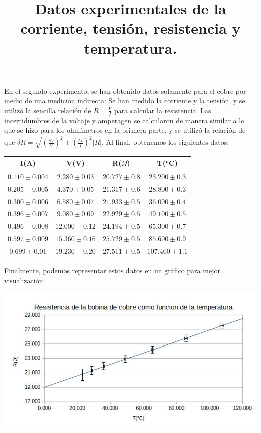 \documentclass[a4paper,12pt]{article}
\begin{document}
En el segundo experimento, se han obtenido datos solamente para el cobre por medio de una medición indirecta: Se han medido la corriente y la tensión, y se utilizó la sencilla relación de $R = \frac{V}{I}$ para calcular la resistencia. Las incertidumbres de la voltaje y amperagen se calcularon de manera similar a lo que se hizo para los ohmímetros en la primera parte, y se utilizó la relación de que $\delta R = \sqrt{\left(\frac{\delta V}{V}\right)^2 +\left(\frac{\delta I}{I}\right)^2 } |R|$. Al final, obtenemos los siguientes datos:
\begin{table}[h!]
    \title{\textbf{Datos experimentales de la corriente, tensión, resistencia y temperatura.}}
    \centering
     \begin{tabular}{||c|c|c|c||} 
     \hline
     I(A) & V(V) & R($\Omega$) & T(°C) \\ \hline
        $0.110\pm 0.004$ & $2.280\pm 0.03$ & $20.727\pm 0.8$ & $23.200\pm 0.3$ \\ \hline
        $0.205\pm 0.005$ & $4.370\pm 0.05$ & $21.317\pm 0.6$ & $28.800\pm 0.3$ \\ \hline
        $0.300\pm 0.006$ & $6.580\pm 0.07$ & $21.933\pm 0.5$ & $36.000 \pm 0.4$\\ \hline
        $0.396\pm 0.007$ & $9.080\pm 0.09$ & $22.929 \pm 0.5$& $49.100 \pm 0.5$\\ \hline
        $0.496\pm 0.008$ & $12.000\pm 0.12$ & $24.194\pm 0.5$ & $65.300\pm 0.7$ \\ \hline
        $0.597\pm 0.009$ & $15.360\pm 0.16$ & $25.729 \pm 0.5$& $85.600 \pm 0.9$\\ \hline
        $0.699\pm 0.01$ & $19.230 \pm 0.20$& $27.511\pm 0.5$ & $107.400 \pm 1.1$\\ \hline 
     \end{tabular}
\end{table}
Finalmente, podemos representar estos datos en un gráfico para mejor visualización:

\includegraphics[width=\textwidth]{Exp1_G2.jpg}
\end{document}
